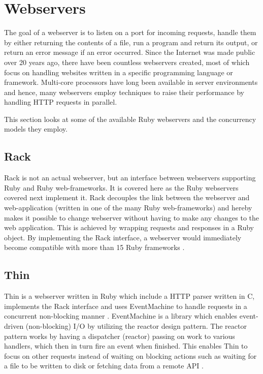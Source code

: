\section{Webservers}
\label{webservers}

The goal of a webserver is to listen on a port for incoming requests, handle them
by either returning the contents of a file, run a program and return its
output, or return an error message if an error occurred. Since the Internet was
made public over 20 years ago, there have been countless webservers created, most
of which focus on handling websites written in a specific programming language
or framework. Multi-core processors have long been available in server
environments and hence, many webservers employ techniques to raise their
performance by handling HTTP requests in parallel.

This section looks at some of the available Ruby webservers and the
concurrency models they employ.

\subsection{Rack}
Rack is not an actual webserver, but an interface between webservers
supporting Ruby and Ruby web-frameworks. It is covered here as the Ruby
webservers covered next implement it. Rack decouples the link between the
webserver and web-application (written in one of the many Ruby web-frameworks) and
hereby makes it possible to change webserver without having to make any
changes to the web application. This is achieved by wrapping requests and
responses in a Ruby object. By implementing the Rack interface, a webserver
would immediately become compatible with more than 15 Ruby frameworks
\cite{rackspec}.

\subsection{Thin}
Thin is a webserver written in Ruby which include a HTTP parser written in C,
implements the Rack interface and uses EventMachine to handle requests in a
concurrent non-blocking manner \cite{thin}. EventMachine is a library which enables
event-driven (non-blocking) I/O by utilizing the reactor design pattern. The
reactor pattern works by having a dispatcher (reactor) passing on work to
various handlers, which then in turn fire an event when finished. This enables
Thin to focus on other requests instead of waiting on blocking actions such as
waiting for a file to be written to disk or fetching data from a remote API
\cite{reactor}.

